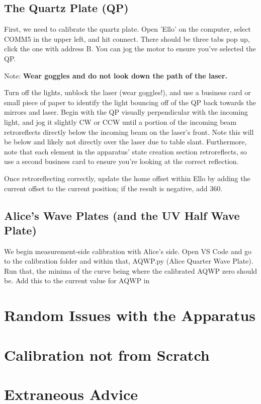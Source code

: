 \documentclass{paper}[11pt]
\begin{document}
\subsection{The Quartz Plate (QP)}
First, we need to calibrate the quartz plate. Open 'Ello' on the computer, select COMM5 in the upper left, and hit connect. There should be three tabs pop up, click the one with address B. You can jog the motor to ensure you've selected the QP. 

Note: \textbf{Wear goggles and do not look down the path of the laser.}

Turn off the lights, unblock the laser (wear goggles!), and use a business card or small piece of paper to identify the light bouncing off of the QP back towards the mirrors and laser. Begin with the QP visually perpendicular with the incoming light, and jog it slightly CW or CCW until a portion of the incoming beam retroreflects directly below the incoming beam on the laser's front. Note this will be below and likely not directly over the laser due to table slant. Furthermore, note that each element in the apparatus' state creation section retroreflects, so use a second business card to ensure you're looking at the correct reflection.

Once retroreflecting correctly, update the home offset within Ello by adding the current offset to the current position; if the result is negative, add 360. 

\subsection{Alice's Wave Plates (and the UV Half Wave Plate)}
We begin measurement-side calibration with Alice's side. Open VS Code and go to the calibration folder and within that, AQWP.py (Alice Quarter Wave Plate). Run that, the minima of the curve being where the calibrated AQWP zero should be. Add this to the current value for AQWP in 


\section{Random Issues with the Apparatus}
\section{Calibration not from Scratch}
\section{Extraneous Advice}
\end{document}
